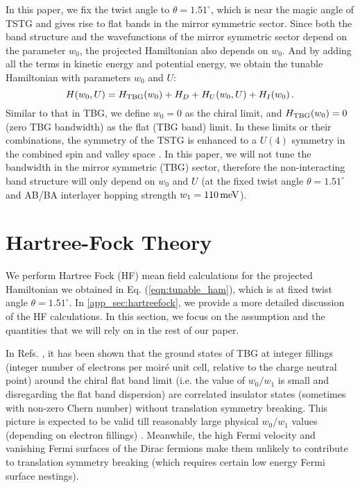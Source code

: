 \documentclass[prb,aps,nofootinbib,amssymb,twocolumn,superscriptaddress,10pt]{revtex4-2}
\begin{document}
In this paper, we fix the twist angle to $\theta=1.51^\circ$, which is near the magic angle of TSTG and gives rise to flat bands in the mirror symmetric sector. 
Since both the band structure and the wavefunctions of the mirror symmetric sector depend on the parameter $w_0$, the projected Hamiltonian also depends on $w_0$. And by adding all the terms in kinetic energy and potential energy, we obtain the tunable Hamiltonian with parameters $w_0$ and $U$:
\begin{equation}\label{eqn:tunable_ham}
	H(w_0, U) = H_{\rm TBG}(w_0) + H_D + H_U(w_0, U) + H_I(w_0)\,.
\end{equation}
Similar to that in TBG, we define $w_0=0$ as the chiral limit, and $H_{\rm TBG}(w_0)=0$ (zero TBG bandwidth) as the flat (TBG band) limit. In these limits or their combinations, the symmetry of the TSTG is enhanced to a $U(4)$ symmetry in the combined spin and valley space \cite{TSTGI}. In this paper, we will not tune the bandwidth in the mirror symmetric (TBG) sector, therefore the non-interacting band structure will only depend on $w_0$ and $U$ (at the fixed twist angle $\theta=1.51^\circ$ and AB/BA interlayer hopping strength $w_1 = 110\,\rm meV$).

\section{Hartree-Fock Theory}\label{sec:HF}
We perform Hartree Fock (HF) mean field calculations for the projected Hamiltonian we obtained in Eq. (\ref{eqn:tunable_ham}), which is at fixed twist angle $\theta=1.51^\circ$. In \ref{app_sec:hartreefock}, we provide a more detailed discussion of the HF calculations. In this section, we focus on the assumption and the quantities that we will rely on in the rest of our paper. 

In Refs. \cite{KAN18, ZHA20, BUL20, LIA20,XIE20a}, it has been shown that the ground states of TBG at integer fillings (integer number of electrons per moir\'e unit cell, relative to the charge neutral point) around the chiral flat band limit (i.e. the value of $w_0/w_1$ is small and disregarding the flat band dispersion) are correlated insulator states (sometimes with non-zero Chern number) without translation symmetry breaking. This picture is expected to be valid till reasonably large physical $w_0/w_1$ values (depending on electron fillings) \cite{KAN20a,SOE20, XIE20a}. Meanwhile, the high Fermi velocity and vanishing Fermi surfaces of the Dirac fermions make them unlikely to contribute to translation symmetry breaking (which requires certain low energy Fermi surface nestings). 
\end{document}
